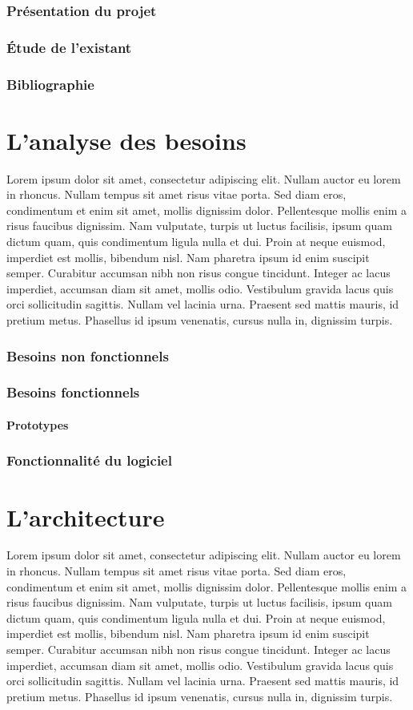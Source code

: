 \documentclass[12pt]{article}
\begin{document}
	\section{Présentation du projet}
	\section{Étude de l’existant}
	\section{Bibliographie}

\part{L'analyse des besoins}
Lorem ipsum dolor sit amet, consectetur adipiscing elit. Nullam auctor eu lorem in rhoncus. Nullam tempus sit amet risus vitae porta. Sed diam eros, condimentum et enim sit amet, mollis dignissim dolor. Pellentesque mollis enim a risus faucibus dignissim. Nam vulputate, turpis ut luctus facilisis, ipsum quam dictum quam, quis condimentum ligula nulla et dui. Proin at neque euismod, imperdiet est mollis, bibendum nisl. Nam pharetra ipsum id enim suscipit semper. Curabitur accumsan nibh non risus congue tincidunt. Integer ac lacus imperdiet, accumsan diam sit amet, mollis odio. Vestibulum gravida lacus quis orci sollicitudin sagittis. Nullam vel lacinia urna. Praesent sed mattis mauris, id pretium metus. Phasellus id ipsum venenatis, cursus nulla in, dignissim turpis.
	\section{Besoins non fonctionnels}
	\section{Besoins fonctionnels}
		\subsection{Prototypes}
	\section{Fonctionnalité du logiciel}

\part{L'architecture}
Lorem ipsum dolor sit amet, consectetur adipiscing elit. Nullam auctor eu lorem in rhoncus. Nullam tempus sit amet risus vitae porta. Sed diam eros, condimentum et enim sit amet, mollis dignissim dolor. Pellentesque mollis enim a risus faucibus dignissim. Nam vulputate, turpis ut luctus facilisis, ipsum quam dictum quam, quis condimentum ligula nulla et dui. Proin at neque euismod, imperdiet est mollis, bibendum nisl. Nam pharetra ipsum id enim suscipit semper. Curabitur accumsan nibh non risus congue tincidunt. Integer ac lacus imperdiet, accumsan diam sit amet, mollis odio. Vestibulum gravida lacus quis orci sollicitudin sagittis. Nullam vel lacinia urna. Praesent sed mattis mauris, id pretium metus. Phasellus id ipsum venenatis, cursus nulla in, dignissim turpis.
\end{document}
